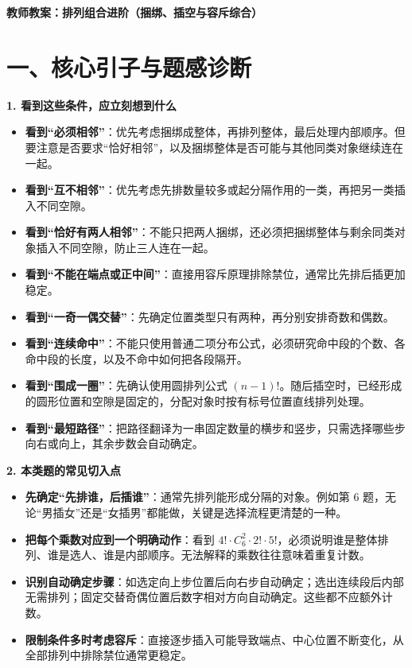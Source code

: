 \documentclass[11pt,a4paper]{ctexart}
\begin{document}
\begin{center}
  {\LARGE\bfseries 教师教案：排列组合进阶（捆绑、插空与容斥综合）}
\end{center}
\vspace{1em}

\section*{一、核心引子与题感诊断}

\textbf{1. 看到这些条件，应立刻想到什么}
\begin{itemize}[itemsep=0.3em]
    \item \textbf{看到“必须相邻”}：优先考虑捆绑成整体，再排列整体，最后处理内部顺序。但要注意是否要求“恰好相邻”，以及捆绑整体是否可能与其他同类对象继续连在一起。
    \item \textbf{看到“互不相邻”}：优先考虑先排数量较多或起分隔作用的一类，再把另一类插入不同空隙。
    \item \textbf{看到“恰好有两人相邻”}：不能只把两人捆绑，还必须把捆绑整体与剩余同类对象插入不同空隙，防止三人连在一起。
    \item \textbf{看到“不能在端点或正中间”}：直接用容斥原理排除禁位，通常比先排后插更加稳定。
    \item \textbf{看到“一奇一偶交替”}：先确定位置类型只有两种，再分别安排奇数和偶数。
    \item \textbf{看到“连续命中”}：不能只使用普通二项分布公式，必须研究命中段的个数、各命中段的长度，以及不命中如何把各段隔开。
    \item \textbf{看到“围成一圈”}：先确认使用圆排列公式 $(n-1)!$。随后插空时，已经形成的圆形位置和空隙是固定的，分配对象时按有标号位置直线排列处理。
    \item \textbf{看到“最短路径”}：把路径翻译为一串固定数量的横步和竖步，只需选择哪些步向右或向上，其余步数会自动确定。
\end{itemize}

\textbf{2. 本类题的常见切入点}
\begin{itemize}[itemsep=0.3em]
    \item \textbf{先确定“先排谁，后插谁”}：通常先排列能形成分隔的对象。例如第 6 题，无论“男插女”还是“女插男”都能做，关键是选择流程更清楚的一种。
    \item \textbf{把每个乘数对应到一个明确动作}：看到 $4!\cdot C_6^2\cdot 2!\cdot 5!$，必须说明谁是整体排列、谁是选人、谁是内部顺序。无法解释的乘数往往意味着重复计数。
    \item \textbf{识别自动确定步骤}：如选定向上步位置后向右步自动确定；选出连续段后内部无需排列；固定交替奇偶位置后数字相对方向自动确定。这些都不应额外计数。
    \item \textbf{限制条件多时考虑容斥}：直接逐步插入可能导致端点、中心位置不断变化，从全部排列中排除禁位通常更稳定。
\end{itemize}
\end{document}
